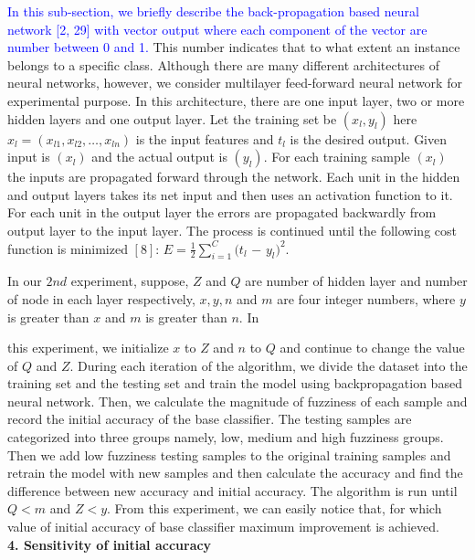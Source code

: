 \documentclass{article}
\begin{document}
		\textcolor{blue}{In this sub-section, we briefly describe the back-propagation based neural network [2, 29] \cite{de2020degree, sahu2017fuzziness} with vector output where each component of the vector are number between 0 and 1.} This number indicates that to what extent an instance belongs to a specific class. Although there are many different architectures of neural networks, however, we consider multilayer feed-forward neural network for experimental purpose. In this architecture, there are one input layer, two or more hidden layers and one output layer. Let the training set be $(x_l, y_l)$ here $x_l = (x_{l1}, x_{l2}, \ldots, x_{ln})$ is the input features and $t_l$ is the desired output. Given input is $(x_l)$ and the actual output is $(y_l)$. For each training sample $(x_l)$ the inputs are propagated forward through the network. Each unit in the hidden and output layers takes its net input and then uses an activation function to it. For each unit in the output layer the errors are propagated backwardly from output layer to the input layer. The process is continued until the following cost function is minimized $[8]$: $E = \frac{1}{2}\sum_{i=1}^{C}(t_l$ $-$ $y_l)^2$. 
		
		In our $2nd$ experiment, suppose, $Z$ and $Q$ are number of hidden layer and number of node in each layer respectively, $x,y,n$ and $m$ are four integer numbers, where $y$ is greater than $x$ and $m$ is greater than $n$. In
		
		
		\newpage 
		this experiment, we initialize $x$ to $Z$ and $n$ to $Q$ and continue to change the value of $Q$ and $Z$. During each iteration of the algorithm, we divide the dataset into the training set and the testing set and train the model using backpropagation based neural network. Then, we calculate the magnitude of fuzziness of each sample and record the initial accuracy of the base classifier. The testing samples are categorized into three groups namely, low, medium and high fuzziness groups. Then we add low fuzziness testing samples to the original training samples and retrain the model with new samples and then calculate the accuracy and find the difference between new accuracy and initial accuracy. The algorithm is run until $Q < m$ and $Z < y$. From this experiment, we can easily notice that, for which value of initial accuracy of base classifier maximum improvement is achieved.\\
		
		\textbf{4. Sensitivity of initial accuracy}\\
		
\end{document}
